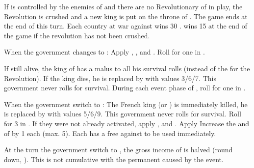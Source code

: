 \phpaix
\aparag If \villeParis is controlled by the enemies of \FRA and there are no
Revolutionary \ARMY of \FRA in play, the Revolution is crushed and a new king
is put on the throne of \FRA.
\bparag The game ends at the end of this turn.
\bparag Each country at war against \FRA wins 30 \VPs.
\bparag \FRA wins 15 \VPs at the end of the game if the revolution has not
been crushed.

\begin{digressions}



  \phdipl
  \aparag When the government changes to \monarqueConvention:
  \bparag Apply ,
  ,  and
  .
  \bparag Roll for one \REVOLT in \FRA.

  \effetlong
  \aparag If still alive, the king of \FRA has a  malus to all his
  survival rolls (instead of the  for the Revolution).
  \aparag If the king dies, he is replaced by \monarqueConvention with values
  3/6/7. This government never rolls for survival.
  \aparag During each event phase of \monarqueConvention, roll for one \REVOLT
  in \FRA.



  \phdipl
  \aparag When the government switch to \monarqueTerror:
  \bparag The French king (or \monarqueConvention) is immediately killed, he
  is replaced by \monarqueTerror with values 5/6/9. This government never
  rolls for survival.
  \bparag Roll for 3 \REVOLT in \FRA. %
  \bparag If they were not already activated, apply
  ,  and
  .
  \bparag Apply 
  \bparag Increase the \DTI and \FTI of \FRA by 1 each (max. 5).
  \bparag Each \MAJ has a free \CB against \FRA to be used immediately.

  \phadm
  \aparag At the turn the government switch to \monarqueTerror, the gross
  income of \FRA is halved (round down, ). This is not
  cumulative with the permanent  caused by the event.


\end{digressions}
